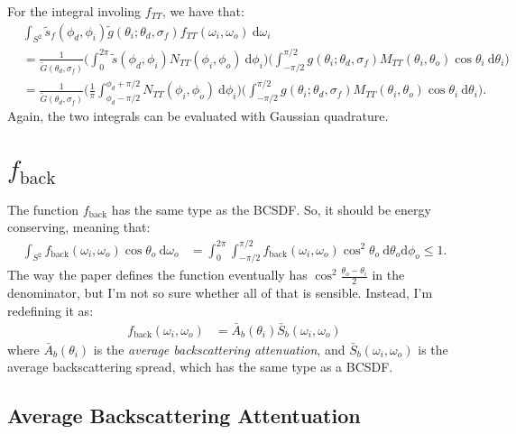 \documentclass[10pt]{article}
\newcommand{\dee}{\mathrm{d}}
\begin{document}
  For the integral involing $f_{TT}$, we have that:
  \begin{align*}
  	& \int_{S^2} \tilde{s}_f(\phi_d, \phi_i) \tilde{g}(\theta_i; \theta_d, \sigma_f) f_{TT}(\omega_i,\omega_o)\ \dee\omega_i \\
  	&= \frac{1}{\tilde{G}(\theta_d,\sigma_f)} \bigg( \int_{0}^{2\pi} \tilde{s}(\phi_d, \phi_i) N_{TT}(\phi_i,\phi_o)\ \dee\phi_i \bigg) \bigg( \int_{-\pi/2}^{\pi/2} g(\theta_i; \theta_d, \sigma_f)M_{TT}(\theta_i, \theta_o)\cos\theta_i\ \dee\theta_i \bigg) \\
  	&= \frac{1}{\tilde{G}(\theta_d,\sigma_f)} \bigg( \frac{1}{\pi} \int_{\phi_d - \pi/2}^{\phi_d + \pi/2} N_{TT}(\phi_i,\phi_o)\ \dee\phi_i \bigg) \bigg( \int_{-\pi/2}^{\pi/2} g(\theta_i; \theta_d, \sigma_f)M_{TT}(\theta_i, \theta_o)\cos\theta_i\ \dee\theta_i \bigg).
  \end{align*}
  Again, the two integrals can be evaluated with Gaussian quadrature.

  \section{$f_{\mathrm{back}}$}
  The function $f_{\mathrm{back}}$ has the same type as the BCSDF.  So, it should be energy conserving, meaning that:
  \begin{align*}
  	\int_{S^2} f_{\mathrm{back}}(\omega_i,\omega_o) \cos\theta_o\ \dee\omega_o
  	&= \int_{0}^{2\pi} \int_{-\pi/2}^{\pi/2} f_{\mathrm{back}}(\omega_i,\omega_o) \cos^2\theta_o\ \dee\theta_o \dee\phi_o
  	\leq 1.
  \end{align*}
  The way the paper defines the function eventually has $\cos^2 \frac{\theta_o - \theta_i}{2}$ in the denominator, but I'm not so sure whether all of that is sensible.  Instead, I'm redefining it as:
  \begin{align*}
  	f_{\mathrm{back}}(\omega_i, \omega_o)
  	&= \bar{A}_b(\theta_i) \bar{S}_b(\omega_i, \omega_o)
  \end{align*}
  where $\bar{A}_b(\theta_i)$ is the \emph{average backscattering attenuation}, and $\bar{S}_b(\omega_i, \omega_o)$ is the {average backscattering spread}, which has the same type as a BCSDF.

  \subsection{Average Backscattering Attentuation}
\end{document}
